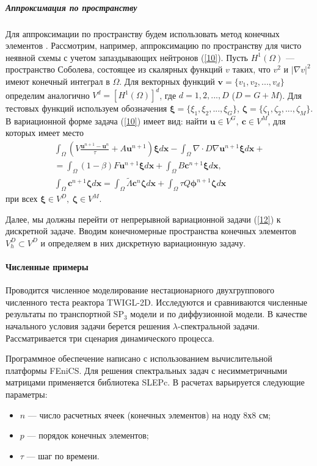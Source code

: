 \documentclass{crm-article}
\begin{document}
\subparagraph{Аппроксимация по пространству}
Для аппроксимации по пространству будем использовать метод конечных элементов \cite{brenner,quarteroni}. 
Рассмотрим, например, аппроксимацию по пространству для чисто неявной схемы с учетом запаздывающих нейтронов (\ref{10}).
Пусть $H^1(\Omega)$ --- пространство Соболева, состоящее из скалярных функций $v$ таких, что $v^2$ и  $\vert\nabla v\vert^2$ имеют конечный интеграл в $\Omega$. 
Для векторных функций $\bm v = \{v_1, v_2, ..., v_d\}$ определим аналогично $V^d = [H^1(\Omega)]^d$, где $d=1,2,...,D$ ($D=G+M$).
Для тестовых функций используем обозначения $\bm \xi  = \{\xi_1, \xi_2, ..., \xi_G\}$,
$\bm \zeta  = \{\zeta_1, \zeta_2, ..., \zeta_M\}$. 
В вариационной форме задача (\ref{10}) имеет вид: найти $\bm u \in V^G, \ \bm c \in V^M$, для которых имеет место
\begin{equation}\label{12}
\begin{split}
\int_\Omega \left (V \frac{\bm{u}^{n+1}-\bm{u}^n}{\tau} + A
\bm u^{n+1} \right )\bm \xi  d\bm x 
- \int_{\Omega} \nabla\cdot D \nabla\bm{u}^{n+1} \bm \xi d\bm x + \\
= \int_\Omega (1-\beta) F \bm{u}^{n+1} \bm \xi d\bm x + \int_\Omega B\bm c^{n+1}\bm \xi d\bm x,
\\
\int_\Omega \bm{c}^{n+1}\bm \zeta d\bm x = \int_\Omega \widetilde{\Lambda}\bm{c}^{n}\bm \zeta  d\bm x + \int_\Omega \tau Q \bm{\phi}^{n+1}\bm \zeta  d\bm x
\end{split}
\end{equation}
при всех $\bm \xi  \in V^D, \ \bm \zeta  \in V^M$.

Далее, мы должны перейти от непрерывной вариационной задачи (\ref{12}) к дискретной задаче. 
Вводим конечномерные пространства конечных элементов $V_h^D \subset V^D$ и определяем в них дискретную вариационную задачу.

\paragraph{Численные примеры}
Проводится численное моделирование нестационарного двухгруппового численного теста реактора TWIGL-2D.
Исследуются и сравниваются численные результаты по транспортной $\mathrm{SP_3}$ модели и по диффузионной модели.
В качестве начального условия задачи берется решения $\lambda$-спектральной задачи. 
Рассматривается три сценария динамического процесса.

Программное обеспечение написано с использованием вычислительной платформы FEniCS. 
Для решения спектральных задач с несимметричными матрицами применяется библиотека SLEPc. 
В расчетах варьируется следующие параметры:
\begin{itemize}\itemsep1pt \parskip0pt 
\item $n$ --- число расчетных ячеек (конечных элементов) на ноду 8х8 см; 
\item $p$ --- порядок конечных элементов;
\item $\tau$ --- шаг по времени.
\end{itemize}
\end{document}
